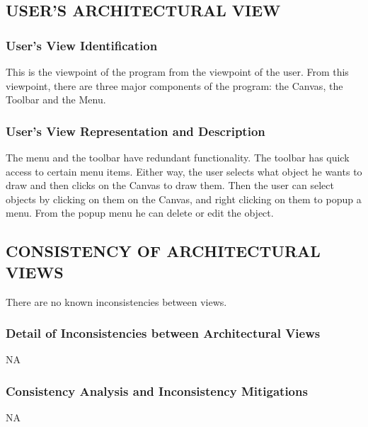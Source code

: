\documentclass[twoside,letterpaper]{article}
\begin{document}
{\clearpage
\subsection[USER{\textquoteright}S ARCHITECTURAL
VIEW]{\bfseries\color{black}
USER{\textquoteright}S ARCHITECTURAL VIEW}

\subsubsection{User{\textquoteright}s View Identification}

{\color{black}
This is the viewpoint of the program from the viewpoint of the user.
From this viewpoint, there are three major components of the
program: the Canvas, the Toolbar and the Menu. }

\subsubsection{User{\textquoteright}s View Representation and
Description }
{\color{black}
The menu and the toolbar have redundant functionality. The toolbar has
quick access to certain menu items. Either way, the user selects what object
he wants to draw and then clicks on the Canvas to draw them. Then the user
can select objects by clicking on them on the Canvas, and right clicking
on them to popup a menu. From the popup menu he can delete or edit the object.}

\subsection[CONSISTENCY OF ARCHITECTURAL
VIEWS]{\bfseries\color{black} CONSISTENCY OF
ARCHITECTURAL VIEWS}
{\color{black}
There are no known inconsistencies between views. }

\subsubsection{Detail of Inconsistencies between Architectural Views}
{\color{black}
NA}

\subsubsection{Consistency Analysis and Inconsistency Mitigations}
{\color{black}
NA}

}
\end{document}
